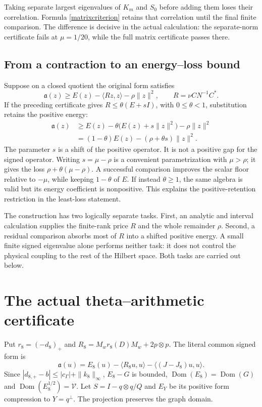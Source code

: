 \documentclass[12pt]{article}
\theoremstyle{remark}\newtheorem{remark}[theorem]{Remark}
\newcommand{\Dom}{\operatorname{Dom}}
\begin{document}
Taking separate largest eigenvalues of $K_m$ and $S_0$ before adding
them loses their correlation. Formula \eqref{matrixcriterion} retains
that correlation until the final finite comparison. The difference is
decisive in the actual calculation: the separate-norm certificate fails
at $\mu=1/20$, while the full matrix certificate passes there.


\subsection{From a contraction to an energy--loss bound}
Suppose on a closed quotient the original form satisfies
\[
 \mathfrak a(z)\ge E(z)-\langle Rz,z\rangle-\rho\|z\|^2,
 \qquad R=\nu CN^{-1}C^*.
\]
If the preceding certificate gives $R\le\theta(E+sI)$, with
$0\le\theta<1$, substitution retains the positive energy:
\begin{align}\label{floorconversion}
 \mathfrak a(z)
 &\ge E(z)-\theta\bigl(E(z)+s\|z\|^2\bigr)-\rho\|z\|^2\\
 &= (1-\theta)E(z)-(\rho+\theta s)\|z\|^2.\nonumber
\end{align}
The parameter $s$ is a shift of the positive operator. It is not a
positive gap for the signed operator. Writing $s=\mu-\rho$ is a
convenient parametrization with $\mu>\rho$; it gives the loss
$\rho+\theta(\mu-\rho)$. A successful comparison improves the
scalar floor relative to $-\mu$, while keeping $1-\theta$ of $E$.
If instead $\theta\ge1$, the same algebra is valid but its energy
coefficient is nonpositive. This explains the positive-retention
restriction in the least-loss statement.

The construction has two logically separate tasks. First, an analytic
and interval calculation supplies the finite-rank price $R$ and the
whole remainder $\rho$. Second, a residual comparison absorbs most
of $R$ into a shifted positive energy. A small finite signed eigenvalue
alone performs neither task: it does not control the physical coupling
to the rest of the Hilbert space. Both tasks are carried out below.

\section{The actual theta--arithmetic certificate}
Put $r_8=(-d_8)_+$ and $R_8=M_wr_8(D)M_w+2p\otimes p$.
The literal common signed form is
\begin{equation}\label{split}
 \mathfrak a(u)=E_8(u)-\langle R_8u,u\rangle
                         -\langle(J-J_8)u,u\rangle.
\end{equation}
Since $|d_{8,+}-b|\le|c_\Gamma|+\|k_8\|_\infty$, $E_8-G$ is
bounded, $\Dom(E_8)=\Dom(G)$ and $\Dom(E_8^{1/2})=\mathcal V$.
Let $S=I-q\otimes q/Q$ and $E_Y$ be its positive form compression
to $Y=q^\perp$. The projection preserves the graph domain.
\end{document}
